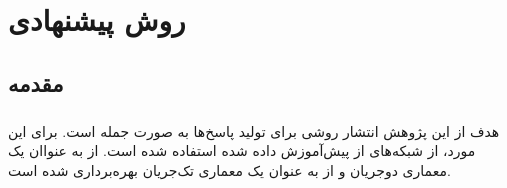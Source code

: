 
\chapter{روش پیشنهادی} \label{ch:method}
\thispagestyle{empty}


\section{مقدمه}
\paragraph{}{
    هدف از این پژوهش انتشار روشی برای تولید پاسخ‌ها به صورت جمله است. برای این 
    مورد، از شبکه‌های از پیش‌آموزش داده شده استفاده شده است. از 
     \cite{tan-bansal-2019-lxmert}
    به عنواان یک معماری دو‌جریان و از 
     \cite{li-etal-2020-bert-vision}
    به عنوان یک معماری تک‌جریان بهره‌برداری شده است. 
}




    







